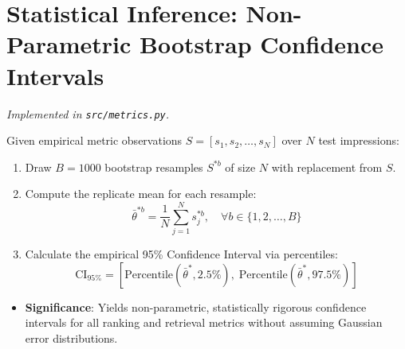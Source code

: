 \documentclass[11pt,a4paper]{article}
\begin{document}
\section{Statistical Inference: Non-Parametric Bootstrap Confidence Intervals}
\textit{Implemented in \texttt{src/metrics.py}.}

Given empirical metric observations $S = [s_1, s_2, \dots, s_N]$ over $N$ test impressions:
\begin{enumerate}
  \item Draw $B = 1000$ bootstrap resamples $S^{*b}$ of size $N$ with replacement from $S$.
  \item Compute the replicate mean for each resample:
  \begin{equation}
  \bar{\theta}^{*b} = \frac{1}{N} \sum_{j=1}^N s^{*b}_j, \quad \forall b \in \{1, 2, \dots, B\}
  \end{equation}
  \item Calculate the empirical 95\% Confidence Interval via percentiles:
  \begin{equation}
  \text{CI}_{95\%} = \left[ \text{Percentile}\left(\bar{\theta}^*, 2.5\%\right), \; \text{Percentile}\left(\bar{\theta}^*, 97.5\%\right) \right]
  \end{equation}
\end{enumerate}

\begin{itemize}
  \item \textbf{Significance}: Yields non-parametric, statistically rigorous confidence intervals for all ranking and retrieval metrics without assuming Gaussian error distributions.
\end{itemize}
\end{document}
